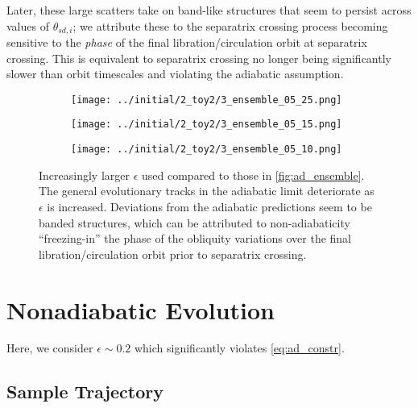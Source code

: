 \documentclass[
        fleqn,
        usenatbib,
    ]{mnras}
\begin{document}
Later, these large scatters take on band-like structures that seem to persist
across values of $\theta_{sd, i}$; we attribute these to the separatrix crossing
process becoming sensitive to the \emph{phase} of the final
libration/circulation orbit at separatrix crossing. This is equivalent to
separatrix crossing no longer being significantly slower than orbit timescales
and violating the adiabatic assumption.
\begin{figure}
    \centering
    \begin{subfigure}{\columnwidth}
        \centering
        \texttt{[image: ../initial/2\_toy2/3\_ensemble\_05\_25.png]}
    \end{subfigure}
    \begin{subfigure}{\columnwidth}
        \centering
        \texttt{[image: ../initial/2\_toy2/3\_ensemble\_05\_15.png]}
    \end{subfigure}
    \begin{subfigure}{\columnwidth}
        \centering
        \texttt{[image: ../initial/2\_toy2/3\_ensemble\_05\_10.png]}
    \end{subfigure}
    \caption{Increasingly larger $\epsilon$ used compared to those in
    \autoref{fig:ad_ensemble}. The general evolutionary tracks in the adiabatic
    limit deteriorate as $\epsilon$ is increased. Deviations from the adiabatic
    predictions seem to be banded structures, which can be attributed to
    non-adiabaticity ``freezing-in'' the phase of the obliquity variations over
    the final libration/circulation orbit prior to separatrix
    crossing.}\label{fig:transition_to_nonad}
\end{figure}

\section{Nonadiabatic Evolution}\label{s:nonad}

Here, we consider $\epsilon \sim 0.2$ which significantly violates
\autoref{eq:ad_constr}.

\subsection{Sample Trajectory}
\end{document}
